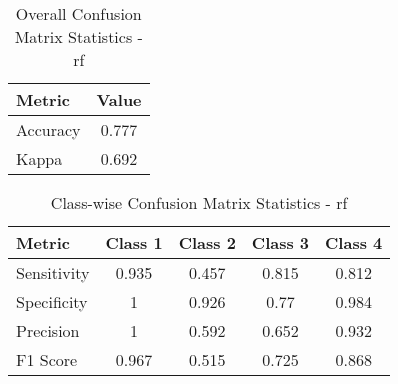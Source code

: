 \begin{table}[h]
\centering
\begin{tabular}{l|c}
Metric & Value \\ \hline
Accuracy & 0.777 \\
Kappa & 0.692 \\
\end{tabular}
\caption{Overall Confusion Matrix Statistics - rf }
\end{table}

\begin{table}[h]
\centering
\begin{tabular}{l|c|c|c|c}
Metric & Class 1 & Class 2 & Class 3 & Class 4 \\ \hline
Sensitivity & 0.935 & 0.457 & 0.815 & 0.812 \\
Specificity & 1 & 0.926 & 0.77 & 0.984 \\
Precision & 1 & 0.592 & 0.652 & 0.932 \\
F1 Score & 0.967 & 0.515 & 0.725 & 0.868 \\
\end{tabular}
\caption{Class-wise Confusion Matrix Statistics - rf }
\end{table}
